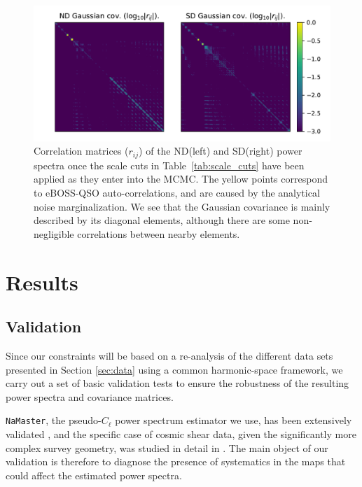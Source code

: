 \documentclass[a4paper,11pt]{article}
\newcommand{\nmt}{\texttt{NaMaster}\xspace}
\newcommand{\eboss}{eBOSS-QSO\xspace}
\newcommand{\northd}{ND\xspace}
\newcommand{\southd}{SD\xspace}
\begin{document}
      \begin{figure}
        \centering
        \includegraphics[width=\textwidth]{figures/ND_SD_covG_corr.pdf}
        \caption{Correlation matrices ($r_{ij}$) of the \northd (left) and \southd (right) power spectra once the scale cuts in Table~\ref{tab:scale_cuts} have been applied as they enter into the MCMC. The yellow points correspond to \eboss auto-correlations, and are caused by the analytical noise marginalization. We see that the Gaussian covariance is mainly described by its diagonal elements, although there are some non-negligible correlations between nearby elements.}\label{fig:covG_corr}
      \end{figure}

  \section{Results}\label{sec:res}
    \subsection{Validation}\label{ssec:res.val}
      Since our constraints will be based on a re-analysis of the different data sets presented in Section \ref{sec:data} using a common harmonic-space framework, we carry out a set of basic validation tests to ensure the robustness of the resulting power spectra and covariance matrices. 
  
      \nmt{}, the pseudo-$C_\ell$ power spectrum estimator we use, has been extensively validated \cite{1809.09603,1906.11765}, and the specific case of cosmic shear data, given the significantly more complex survey geometry, was studied in detail in \cite{2010.09717}. The main object of our validation is therefore to diagnose the presence of systematics in the maps that could affect the estimated power spectra.
\end{document}
